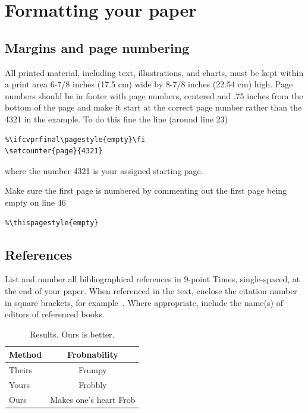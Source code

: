 \documentclass[10pt,twocolumn,letterpaper]{article}
\begin{document}
\section{Formatting your paper}



\subsection{Margins and page numbering}

All printed material, including text, illustrations, and charts, must be kept
within a print area 6-7/8 inches (17.5 cm) wide by 8-7/8 inches (22.54 cm)
high.
Page numbers should be in footer with page numbers, centered and .75
inches from the bottom of the page and make it start at the correct page
number rather than the 4321 in the example.  To do this fine the line (around
line 23)
\begin{verbatim}
%\ifcvprfinal\pagestyle{empty}\fi
\setcounter{page}{4321}
\end{verbatim}
where the number 4321 is your assigned starting page.

Make sure the first page is numbered by commenting out the first page being
empty on line 46
\begin{verbatim}
%\thispagestyle{empty}
\end{verbatim}


\subsection{References}

List and number all bibliographical references in 9-point Times,
single-spaced, at the end of your paper. When referenced in the text,
enclose the citation number in square brackets, for
example~\cite{Authors14}.  Where appropriate, include the name(s) of
editors of referenced books.

\begin{table}
\begin{center}
\begin{tabular}{|l|c|}
\hline
Method & Frobnability \\
\hline\hline
Theirs & Frumpy \\
Yours & Frobbly \\
Ours & Makes one's heart Frob\\
\hline
\end{tabular}
\end{center}
\caption{Results. Ours is better.}
\label{mytable}
\end{table}
\end{document}
